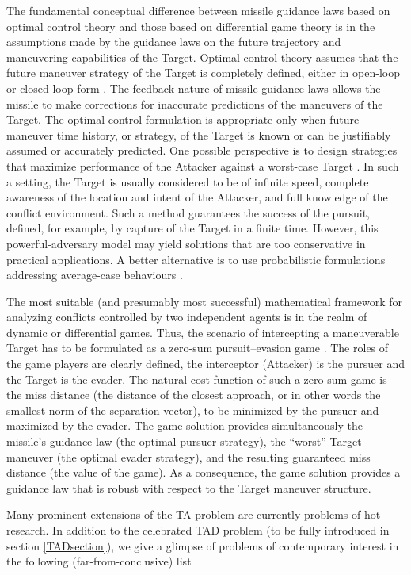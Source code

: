 The fundamental conceptual difference between missile guidance laws based on optimal control theory and those based on differential game theory is in the assumptions made by the guidance laws on the future trajectory and maneuvering capabilities of the Target. Optimal control theory assumes that the future maneuver strategy of the Target is completely defined, either in open-loop or closed-loop form \cite{anderson2012comparison}. The feedback nature of missile guidance laws allows the missile to make corrections for inaccurate predictions of the maneuvers of the Target. The optimal-control formulation is appropriate only when future maneuver time history, or strategy, of the Target is known or can be justifiably assumed or accurately predicted. One possible perspective is to design strategies that maximize performance of the Attacker against a worst-case Target \cite{chung2011search}. In such a setting, the Target is usually considered to be of infinite speed, complete awareness of the location and intent of the Attacker, and full knowledge of the conflict environment. Such a method guarantees the success of the pursuit, defined, for example, by capture of the Target in a finite time. However, this powerful-adversary model may yield solutions that are too conservative in practical applications. A better alternative is to use probabilistic formulations addressing average-case behaviours \cite{chung2011search}. 

The most suitable (and presumably most successful) mathematical framework for analyzing conflicts controlled by two independent agents is in the realm of dynamic or differential games. Thus, the scenario of intercepting a maneuverable Target has to be formulated as a zero-sum pursuit–evasion game \cite{turetsky2003missile}. The roles of the game players are clearly defined, the interceptor (Attacker) is the pursuer and the Target is the evader. The natural cost function of such a zero-sum game is the miss distance (the distance of the closest approach, or in other words the smallest norm of the separation vector), to be minimized by the pursuer and maximized by the evader. The game solution provides simultaneously the missile’s guidance law (the optimal pursuer strategy), the “worst” Target maneuver (the optimal evader strategy), and the resulting guaranteed miss distance (the value of the game). As a consequence, the game solution provides a guidance law that is robust with respect to the Target maneuver structure.

Many prominent extensions of the TA problem are currently problems of hot research. In addition to the celebrated TAD problem (to be fully introduced in section \ref{TADsection}), we give a glimpse of problems of contemporary interest in the following (far-from-conclusive) list

